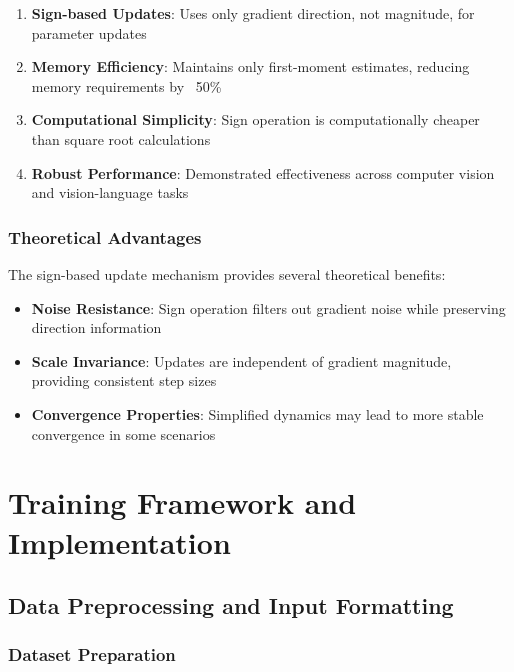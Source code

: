 \begin{enumerate}
    \item \textbf{Sign-based Updates}: Uses only gradient direction, not magnitude, for parameter updates
    \item \textbf{Memory Efficiency}: Maintains only first-moment estimates, reducing memory requirements by ~50\%
    \item \textbf{Computational Simplicity}: Sign operation is computationally cheaper than square root calculations
    \item \textbf{Robust Performance}: Demonstrated effectiveness across computer vision and vision-language tasks
\end{enumerate}

\subsubsection{Theoretical Advantages}

The sign-based update mechanism provides several theoretical benefits:

\begin{itemize}
    \item \textbf{Noise Resistance}: Sign operation filters out gradient noise while preserving direction information
    \item \textbf{Scale Invariance}: Updates are independent of gradient magnitude, providing consistent step sizes
    \item \textbf{Convergence Properties}: Simplified dynamics may lead to more stable convergence in some scenarios
\end{itemize}


\section{Training Framework and Implementation}

\subsection{Data Preprocessing and Input Formatting}

\subsubsection{Dataset Preparation}

